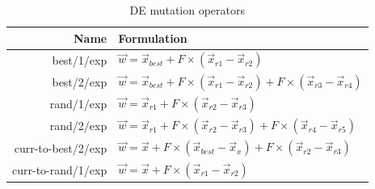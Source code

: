 
\begin{table}[h]
    \centering
    \begin{tabular}{r | l} \hline \hline
        Name & Formulation \\ \hline \hline
        best/1/exp       & $\Vec{w} = \Vec{x}_{best} + F \times (\Vec{x}_{r1} - \Vec{x}_{r2})$ \\ \hline
        best/2/exp       & $\Vec{w} = \Vec{x}_{best} + F \times (\Vec{x}_{r1} - \Vec{x}_{r2}) + F \times (\Vec{x}_{r3} - \Vec{x}_{r4})$ \\ \hline
        rand/1/exp       & $\Vec{w} = \Vec{x}_{r1} + F \times (\Vec{x}_{r2} - \Vec{x}_{r3})$ \\ \hline
        rand/2/exp       & $\Vec{w} = \Vec{x}_{r1} + F \times (\Vec{x}_{r2} - \Vec{x}_{r3}) + F \times (\Vec{x}_{r4} - \Vec{x}_{r5})$ \\ \hline
        curr-to-best/2/exp & $\Vec{w} = \Vec{x} + F \times (\Vec{x}_{best} - \Vec{x}_{x}) + F \times (\Vec{x}_{r2} - \Vec{x}_{r3})$ \\ \hline
        curr-to-rand/1/exp & $\Vec{w} = \Vec{x} + F \times (\Vec{x}_{r1} - \Vec{x}_{r2})$ \\ \hline \hline
    \end{tabular}
    \caption{DE mutation operators}
    \label{tab:de-mutations}
\end{table}

